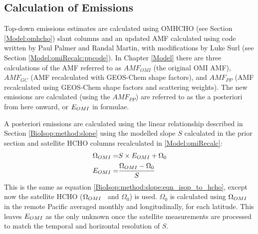     
  \subsection{Calculation of Emissions}
    \label{BioIsop:method:calculation}
   
    Top-down emissions estimates are calculated using OMHCHO (see Section \ref{Model:omhcho}) slant columns and an updated AMF calculated using code written by Paul Palmer and Randal Martin, with modifications by Luke Surl (see Section \ref{Model:omiRecalc:ppcode}).
    In Chapter \ref{Model} there are three calculations of the AMF referred to as $AMF_{OMI}$ (the original OMI AMF), $AMF_{GC}$ (AMF recalculated with GEOS-Chem shape factors), and $AMF_{PP}$ (AMF recalculated using GEOS-Chem shape factors and scattering weights).
    The new emissions are calculated (using the $AMF_{PP}$) are referred to as the a posteriori from here onward, or $E_{OMI}$ in formulae.
    
    
    A posteriori emissions are calculated using the linear relationship described in Section \ref{BioIsop:method:slope} using the modelled slope $S$ calculated in the prior section and satellite HCHO columns recalculated in \ref{Model:omiRecalc}:
    \begin{eqnarray} \begin{split}
      \label{BioIsop:method:eqn_Enew}
      \Omega_{OMI} = & S \times E_{OMI} + \Omega_0 \\
      E_{OMI} = & \frac{\Omega_{OMI} - \Omega_{0}}{S}
    \end{split} \end{eqnarray} 
    This is the same as equation \ref{BioIsop:method:slope:eqn_isop_to_hcho}, except now the satellite HCHO ($\Omega_{OMI}$ ~and $\Omega_0$) is used.
    $\Omega_0$ is calculated using $\Omega_{OMI}$ in the remote Pacific averaged monthly and longitudinally, for each latitude.
    This leaves $E_{OMI}$ as the only unknown once the satellite measurements are processed to match the temporal and horizontal resolution of $S$.
    
